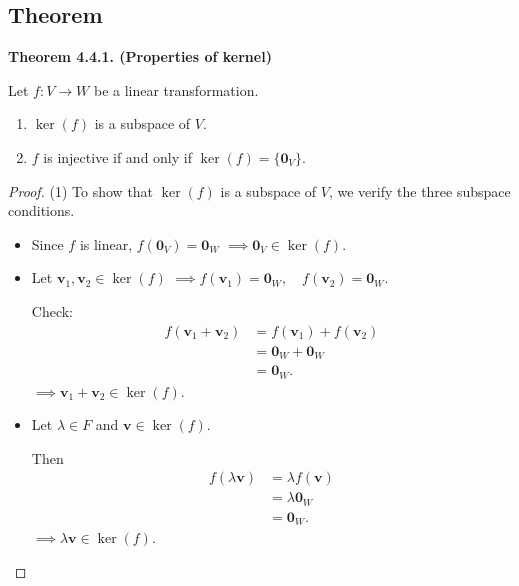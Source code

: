 \documentclass[12pt]{article}
\begin{document}
\subsection{Theorem}

\textbf{Theorem 4.4.1. (Properties of kernel)}

Let $f:V\rightarrow W$ be a linear transformation.

\begin{enumerate}
    \item $\operatorname{ker}(f)$ is a subspace of $V$.

    \item $f$ is injective if and only if $\operatorname{ker}(f)=\{\mathbf{0}_V\}$.
\end{enumerate}

\begin{proof}

(1) To show that $\operatorname{ker}(f)$ is a subspace of $V$, we verify the three subspace conditions.

\begin{itemize}
    \item {}

    Since $f$ is linear, $f(\mathbf{0}_V)=\mathbf{0}_W$ $\implies \mathbf{0}_V\in\operatorname{ker}(f).$

    \item {}

    Let $\mathbf{v}_1,\mathbf{v}_2\in\operatorname{ker}(f)$ $\implies f(\mathbf{v}_1)=\mathbf{0}_W,\quad f(\mathbf{v}_2)=\mathbf{0}_W.$
    
    Check:
    \[
    \begin{aligned}
    f(\mathbf{v}_1+\mathbf{v}_2)
    &=
    f(\mathbf{v}_1)+f(\mathbf{v}_2)\\
    &=
    \mathbf{0}_W+\mathbf{0}_W\\
    &=
    \mathbf{0}_W.
    \end{aligned}
    \]
    $\implies \mathbf{v}_1+\mathbf{v}_2\in\operatorname{ker}(f)$.
    \newpage

    \item {}

    Let
    $\lambda\in F$ and $\mathbf{v}\in\operatorname{ker}(f)$.

    Then
    \[
    \begin{aligned}
    f(\lambda\mathbf{v})
    &=
    \lambda f(\mathbf{v})\\
    &=
    \lambda\mathbf{0}_W\\
    &=
    \mathbf{0}_W.
    \end{aligned}
    \]
    $\implies \lambda\mathbf{v}\in\operatorname{ker}(f)$.


\end{itemize}
\end{proof}
\end{document}
